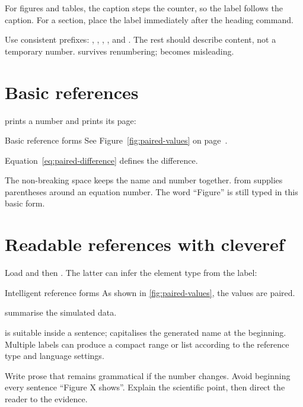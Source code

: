 For figures and tables, the caption steps the counter, so the label follows the
caption. For a section, place the label immediately after the heading command.

Use consistent prefixes: , , ,
, and . The rest should describe content, not a temporary
number.  survives renumbering;
 becomes misleading.

\section{Basic references}

 prints a number and  prints its page:

\begin{latexcode}{Basic reference forms}
See Figure~\ref{fig:paired-values} on
page~\pageref{fig:paired-values}.

Equation~\eqref{eq:paired-difference} defines the difference.
\end{latexcode}

The non-breaking space keeps the name and number together.  from
 supplies parentheses around an equation number. The word
``Figure'' is still typed in this basic form.

\section{Readable references with cleveref}

Load  and then . The latter can infer the element
type from the label:

\begin{latexcode}{Intelligent reference forms}
As shown in \cref{fig:paired-values}, the values are paired.

summarise the simulated data.
\end{latexcode}

 is suitable inside a sentence;  capitalises the generated
name at the beginning. Multiple labels can produce a compact range or list
according to the reference type and language settings.

\begin{goodpractice}
Write prose that remains grammatical if the number changes. Avoid beginning
every sentence ``Figure X shows''. Explain the scientific point, then direct
the reader to the evidence.
\end{goodpractice}

